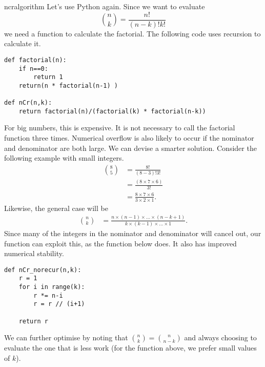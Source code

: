 \begin{answer}{ncralgorithm}
Let's use Python again.
Since we want to evaluate
\[
\binom{n}{k} = \frac{n!}{ (n-k)! k! }
\]
we need a function to calculate the factorial.
The  following code uses recursion to calculate it.
\begin{verbatim}
def factorial(n):
    if n==0:
        return 1
    return(n * factorial(n-1) )

def nCr(n,k):
    return factorial(n)/(factorial(k) * factorial(n-k))
\end{verbatim}
For big numbers, this is expensive.
It is not necessary to call the factorial function three times.
Numerical overflow is also likely to occur if the nominator and denominator are both large.
We can devise a smarter solution.
Consider the following example with small integers.
\begin{align*}
\binom{8}{5} &= \frac{8!}{ (8-3)! 3! } \\
             &= \frac{(8 \times 7 \times 6 )}{3!} \\
             &= \frac{8 \times 7 \times 6 }{  3 \times 2 \times 1 }
\text{.}
\end{align*}
Likewise, the general case will be
\begin{align*}
\binom{n}{k}
             &= \frac
             { n \times (n-1) \times  \ldots \times (n-k+1) }
             { k \times (k-1) \times \ldots \times 1 }
\text{.}
\end{align*}
Since many of the integers in the nominator and denominator will cancel out, our function can exploit this, as the function below does. It also has improved numerical stability.
\begin{verbatim}
def nCr_norecur(n,k):
    r = 1
    for i in range(k):
        r *= n-i
        r = r // (i+1)

    return r
\end{verbatim}
We can further optimise by noting that $\binom{n}{k}=\binom{n}{n-k}$ and always choosing to evaluate the one that is less work (for the function above, we prefer small values of $k$).
\end{answer}
